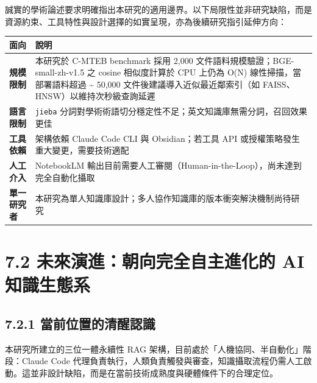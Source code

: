 誠實的學術論述要求明確指出本研究的適用邊界。以下局限性並非研究缺陷，而是資源約束、工具特性與設計選擇的如實呈現，亦為後續研究指引延伸方向：

{\def\LTcaptype{none} %
\begin{longtable}[]{@{}
  >{\raggedright\arraybackslash}p{}
  >{\raggedright\arraybackslash}p{}@{}}
\toprule\noalign{}
\begin{minipage}[b]{\linewidth}\raggedright
面向
\end{minipage} & \begin{minipage}[b]{\linewidth}\raggedright
說明
\end{minipage} \\
\midrule\noalign{}
\endhead
\bottomrule\noalign{}
\endlastfoot
\textbf{規模限制} & 本研究於 C-MTEB benchmark 採用 2,000 文件語料規模驗證；BGE-small-zh-v1.5
之 cosine 相似度計算於 CPU 上仍為 O(N) 線性掃描，當部署語料超過 \textasciitilde
50,000 文件後建議導入近似最近鄰索引（如 FAISS、HNSW）以維持次秒級查詢延遲 \\
\textbf{語言限制} & \texttt{jieba}
分詞對學術術語切分穩定性不足；英文知識庫無需分詞，召回效果更佳 \\
\textbf{工具依賴} & 架構依賴 Claude Code CLI 與 Obsidian；若工具 API
或授權策略發生重大變更，需要技術適配 \\
\textbf{人工介入} & NotebookLM
輸出目前需要人工審閱（Human-in-the-Loop），尚未達到完全自動化攝取 \\
\textbf{單一研究者} &
本研究為單人知識庫設計；多人協作知識庫的版本衝突解決機制尚待研究 \\
\end{longtable}
}

\section{7.2 未來演進：朝向完全自主進化的 AI
知識生態系}\label{ux672aux4f86ux6f14ux9032ux671dux5411ux5b8cux5168ux81eaux4e3bux9032ux5316ux7684-ai-ux77e5ux8b58ux751fux614bux7cfb}

\subsection{7.2.1
當前位置的清醒認識}\label{ux7576ux524dux4f4dux7f6eux7684ux6e05ux9192ux8a8dux8b58}

本研究所建立的三位一體永續性 RAG
架構，目前處於「人機協同、半自動化」階段：Claude Code
代理負責執行，人類負責觸發與審查，知識攝取流程仍需人工啟動。這並非設計缺陷，而是在當前技術成熟度與硬體條件下的合理定位。

